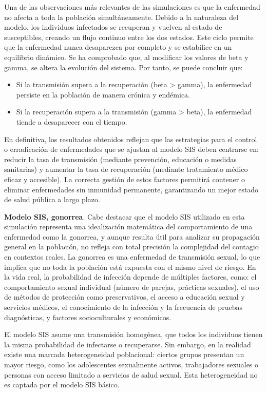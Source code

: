 Una de las observaciones más relevantes de las simulaciones es que la enfermedad no afecta a toda la población simultáneamente. Debido a la naturaleza del modelo, los individuos infectados se recuperan y vuelven al estado de susceptibles, creando un flujo continuo entre los dos estados. Este ciclo permite que la enfermedad nunca desaparezca por completo y se estabilice en un equilibrio dinámico.
Se ha comprobado que, al modificar los valores de beta y gamma, se altera la evolución del sistema. Por tanto, se puede concluir que:
\begin{itemize}
    \item Si la transmisión supera a la recuperación (beta > gamma), la enfermedad persiste en la población de manera crónica y endémica.
    \item Si la recuperación supera a la transmisión (gamma > beta), la enfermedad tiende a desaparecer con el tiempo.
\end{itemize}	
En definitiva, los resultados obtenidos reflejan que las estrategias para el control o erradicación de enfermedades que se ajustan al modelo SIS deben centrarse en: reducir la tasa de transmisión (mediante prevención, educación o medidas sanitarias) y aumentar la tasa de recuperación (mediante tratamiento médico eficaz y accesible). La correcta gestión de estos factores permitirá contener o eliminar enfermedades sin inmunidad permanente, garantizando un mejor estado de salud pública a largo plazo.

\vspace{2em}

\textbf{Modelo SIS, gonorrea}. Cabe destacar que el modelo SIS utilizado en esta simulación representa una idealización matemática del comportamiento de una enfermedad como la gonorrea, y aunque resulta útil para analizar su propagación general en la población, no refleja con total precisión la complejidad del contagio en contextos reales.
La gonorrea es una enfermedad de transmisión sexual, lo que implica que no toda la población está expuesta con el mismo nivel de riesgo. En la vida real, la probabilidad de infección depende de múltiples factores, como: el comportamiento sexual individual (número de parejas, prácticas sexuales), el uso de métodos de protección como preservativos, el acceso a educación sexual y servicios médicos, el conocimiento de la infección y la frecuencia de pruebas diagnósticas, y factores socioculturales y económicos.

El modelo SIS asume una transmisión homogénea, que todos los individuos tienen la misma probabilidad de infectarse o recuperarse. Sin embargo, en la realidad existe una marcada heterogeneidad poblacional: ciertos grupos presentan un mayor riesgo, como los adolescentes sexualmente activos, trabajadores sexuales o personas con acceso limitado a servicios de salud sexual. Esta heterogeneidad no es captada por el modelo SIS básico.

